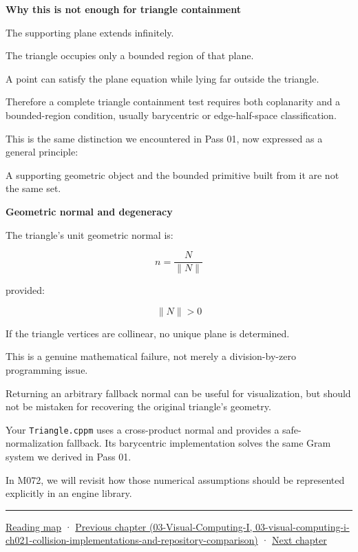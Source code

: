 \textbf{Why this is not enough for triangle containment}

The supporting plane extends infinitely.

The triangle occupies only a bounded region of that plane.

A point can satisfy the plane equation while lying far outside the triangle.

Therefore a complete triangle containment test requires both coplanarity and a bounded-region condition, usually barycentric or edge-half-space classification.

This is the same distinction we encountered in Pass 01, now expressed as a general principle:

A supporting geometric object and the bounded primitive built from it are not the same set.

\textbf{Geometric normal and degeneracy}

The triangle's unit geometric normal is:

\[
n=\frac{N}{\|N\|}
\]

provided:

\[
\|N\|>0
\]

If the triangle vertices are collinear, no unique plane is determined.

This is a genuine mathematical failure, not merely a division-by-zero programming issue.

Returning an arbitrary fallback normal can be useful for visualization, but should not be mistaken for recovering the original triangle's geometry.

Your \texttt{Triangle.cppm} uses a cross-product normal and provides a safe-normalization fallback. Its barycentric implementation solves the same Gram system we derived in Pass 01.

In M072, we will revisit how those numerical assumptions should be represented explicitly in an engine library.

\begin{center}\rule{0.5\linewidth}{0.5pt}\end{center}

\hyperref[volume-reading-map]{Reading map} · \href{../03-Visual-Computing-I/main.pdf\#nameddest=03-visual-computing-i-ch021-collision-implementations-and-repository-comparison}{Previous chapter (03-Visual-Computing-I, 03-visual-computing-i-ch021-collision-implementations-and-repository-comparison)} · \hyperref[04-visual-computing-ii-ch023-mesh-topology-and-connectivity]{Next chapter}
